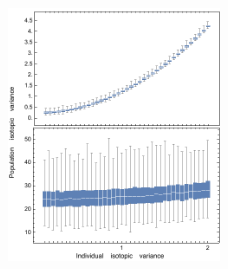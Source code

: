 \documentclass{frontiersSCNS}
\begin{document}
\begin{figure}[h!]
\centering
\includegraphics[width=0.5\textwidth]{fig_indpopvar2.pdf}
\caption{
}
  \label{figindpopvar}
\end{figure}
\end{document}
